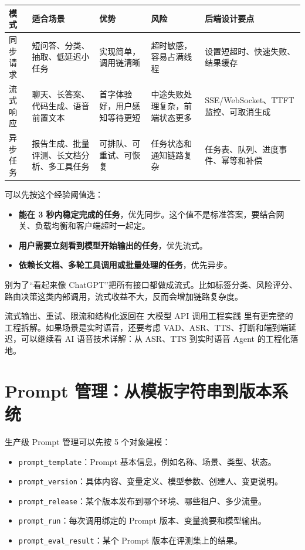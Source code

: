 \documentclass[10pt,a4paper]{ctexart}
\begin{document}
{\footnotesize
\begin{tabularx}{\textwidth}{|X|X|X|X|X|}
\hline
\textbf{模式} & \textbf{适合场景} & \textbf{优势} & \textbf{风险} & \textbf{后端设计要点} \\
\hline
同步请求 & 短问答、分类、抽取、低延迟小任务 & 实现简单，调用链清晰 & 超时敏感，容易占满线程 & 设置短超时、快速失败、结果缓存 \\
\hline
流式响应 & 聊天、长答案、代码生成、语音前置文本 & 首字体验好，用户感知等待更短 & 中途失败处理复杂，前端状态更多 & SSE/WebSocket、TTFT 监控、可取消生成 \\
\hline
异步任务 & 报告生成、批量评测、长文档分析、多工具任务 & 可排队、可重试、可恢复 & 任务状态和通知链路复杂 & 任务表、队列、进度事件、幂等和补偿 \\
\hline
\end{tabularx}
}



可以先按这个经验阈值选：


\begin{itemize}[itemsep=2pt, topsep=4pt]
  \item \textbf{能在 3 秒内稳定完成的任务}，优先同步。这个值不是标准答案，要结合网关、负载均衡和客户端超时一起定。
  \item \textbf{用户需要立刻看到模型开始输出的任务}，优先流式。
  \item \textbf{依赖长文档、多轮工具调用或批量处理的任务}，优先异步。
\end{itemize}


别为了“看起来像 ChatGPT”把所有接口都做成流式。比如标签分类、风险评分、路由决策这类内部调用，流式收益不大，反而会增加链路复杂度。



流式输出、重试、限流和结构化返回在 大模型 API 调用工程实践 里有更完整的工程拆解。如果场景是实时语音，还要考虑 VAD、ASR、TTS、打断和端到端延迟，可以继续看 AI 语音技术详解：从 ASR、TTS 到实时语音 Agent 的工程化落地。



\section{Prompt 管理：从模板字符串到版本系统}


生产级 Prompt 管理可以先按 5 个对象建模：


\begin{itemize}[itemsep=2pt, topsep=4pt]
  \item \texttt{prompt\_template}：Prompt 基本信息，例如名称、场景、类型、状态。
  \item \texttt{prompt\_version}：具体内容、变量定义、模型参数、创建人、变更说明。
  \item \texttt{prompt\_release}：某个版本发布到哪个环境、哪些租户、多少流量。
  \item \texttt{prompt\_run}：每次调用绑定的 Prompt 版本、变量摘要和模型输出。
  \item \texttt{prompt\_eval\_result}：某个 Prompt 版本在评测集上的结果。
\end{itemize}
\end{document}
